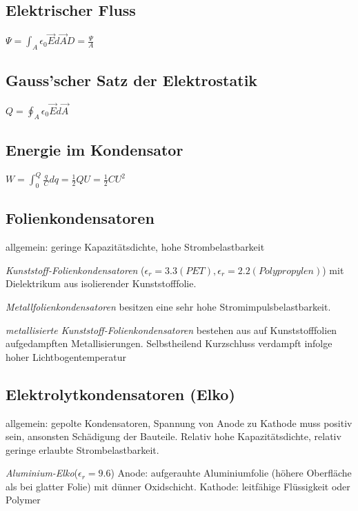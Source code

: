 \documentclass[10pt,a4paper]{scrartcl}
\begin{document}
\begin{multicols*}{3}
	\subsection{Elektrischer Fluss}	
	
	$\Psi=\int_A{\epsilon_0\vec{E}d\vec{A}}$\hfill$D=\frac{\Psi}{A}$
	
	\subsection{Gauss'scher Satz der Elektrostatik}
	
	$Q=\oint_A{\epsilon_0\vec{E}d\vec{A}}$
	
	\subsection{Energie im Kondensator}
	
	$W=\int_0^Q{\frac{q}{C}dq}=\frac{1}{2}QU=\frac{1}{2}CU^2$	
	
	\subsection{Folienkondensatoren}
	
	allgemein: geringe Kapazitätsdichte, hohe Strombelastbarkeit
	
	\emph{Kunststoff-Folienkondensatoren} ($\epsilon_r = 3.3 (PET), \epsilon_r=2.2 (Polypropylen)$) mit Dielektrikum aus isolierender Kunststofffolie.
	
	\emph{Metallfolienkondensatoren} besitzen eine sehr hohe Stromimpulsbelastbarkeit.
	
	\emph{metallisierte Kunststoff-Folienkondensatoren} bestehen aus auf Kunststofffolien aufgedampften Metallisierungen. Selbstheilend \dahe Kurzschluss verdampft infolge hoher Lichtbogentemperatur
	
	 
	
	\subsection{Elektrolytkondensatoren (Elko)}
	
	allgemein: gepolte Kondensatoren, Spannung von Anode zu Kathode muss positiv sein, ansonsten Schädigung der Bauteile.
	Relativ hohe Kapazitätsdichte, relativ geringe erlaubte Strombelastbarkeit.
	
	\emph{Aluminium-Elko}($\epsilon_r=9.6$) Anode: aufgerauhte Aluminiumfolie (höhere Oberfläche als bei glatter Folie) mit dünner Oxidschicht. Kathode: leitfähige Flüssigkeit oder Polymer
	

\end{multicols*}
\end{document}
